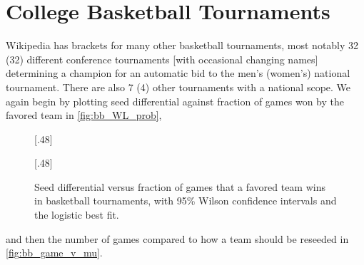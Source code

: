 \documentclass{article}
\begin{document}
\section{College Basketball Tournaments}
Wikipedia has brackets for many other basketball tournaments, most notably 32 (32) different conference tournaments [with occasional changing names] determining a champion for an automatic bid to the men's (women's) national tournament.  There are also 7 (4) other tournaments with a national scope.  We again begin by plotting seed differential against fraction of games won by the favored team in \autoref{fig:bb_WL_prob},
\begin{figure}
[.48\textwidth]{%
}\hfill
{}[.48\textwidth]{%
}
\caption{\label{fig:bb_WL_prob}Seed differential versus fraction of games that a favored team wins in basketball tournaments, with 95\% Wilson confidence intervals and the logistic best fit.}
\end{figure}
and then the number of games compared to how a team should be reseeded in \autoref{fig:bb_game_v_mu}.
\end{document}
